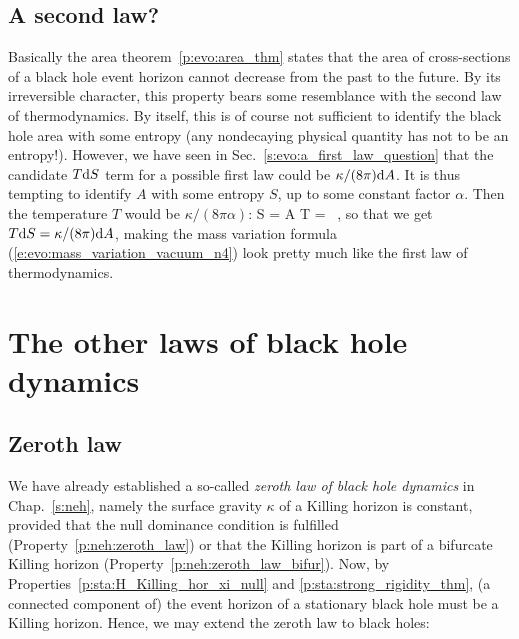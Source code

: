 \subsection{A second law?}

Basically the area theorem~\ref{p:evo:area_thm} states that
the area of cross-sections of a black hole event horizon
cannot decrease from the past to the future.
By its irreversible character, this property bears some resemblance
with the second law of thermodynamics.
By itself, this is of course not sufficient to identify the black hole area
with some entropy (any nondecaying physical quantity has not to be an entropy!).
However, we have seen in Sec.~\ref{s:evo:a_first_law_question} that the
candidate $T\mathrm{d} S$ term for a possible first law could be $\kappa/(8\pi)\mathrm{d} A$.
It is thus tempting to identify $A$ with some entropy $S$, up to some
constant factor $\alpha$. Then the temperature $T$ would be $\kappa/(8\pi\alpha)$:
\be \label{e:evo:identif_S_T}
    S = \alpha A \qand T = \, \kappa ,
\ee
so that we get $T\mathrm{d} S = \kappa/(8\pi)\mathrm{d} A$, making
the mass variation formula (\ref{e:evo:mass_variation_vacuum_n4}) look pretty much like
the first law of thermodynamics.


\section{The other laws of black hole dynamics}

\subsection{Zeroth law}

We have already established a so-called \emph{zeroth law of black hole dynamics}
in Chap.~\ref{s:neh}, namely the surface gravity
$\kappa$ of a Killing horizon is constant, provided that the
null dominance condition is fulfilled (Property~\ref{p:neh:zeroth_law})
or that the Killing horizon is part of a bifurcate Killing horizon
(Property~\ref{p:neh:zeroth_law_bifur}).
Now, by Properties~\ref{p:sta:H_Killing_hor_xi_null}
and \ref{p:sta:strong_rigidity_thm}, (a connected component of) the event horizon
of a stationary black hole must be a Killing horizon. Hence, we may extend
the zeroth law to black holes:


